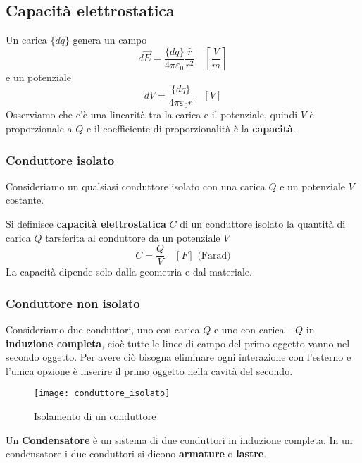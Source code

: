 \documentclass[a4paper]{article}
\begin{document}
\subsection{Capacità elettrostatica}
Un carica \( \{dq\}  \) genera un campo
\[
  d\vec{E} = \frac{\{dq\}}{4 \pi \varepsilon _0} \frac{\hat{r}}{r^2} \quad \left[ \frac{V}{m} \right]
\]
e un potenziale
\[
  dV = \frac{\{dq\}}{4 \pi \varepsilon_0 r} \quad \left[ V \right]
\] 
Osserviamo che c'è una linearità tra la carica e il potenziale, quindi \( V \) è
proporzionale a \( Q \) e il coefficiente di proporzionalità è la \textbf{capacità}.

\subsubsection{Conduttore isolato}
Consideriamo un qualsiasi conduttore isolato con una carica \( Q \) e un potenziale
\( V \) costante.

\begin{definition}
  Si definisce \textbf{capacità elettrostatica} \( C \) di un conduttore isolato la
  quantità di carica \( Q \) tarsferita al conduttore da un potenziale \( V \)
  \[
    C = \frac{Q}{V} \quad \left[ F \right] \text{ (Farad)}
  \]
  La capacità dipende solo dalla geometria e dal materiale.
\end{definition}

\subsubsection{Conduttore non isolato}
Consideriamo due conduttori, uno con carica \( Q \) e uno con carica \( -Q \) in
\textbf{induzione completa}, cioè tutte le linee di campo del primo oggetto vanno nel
secondo oggetto. Per avere ciò bisogna eliminare ogni interazione con l'esterno e l'unica
opzione è inserire il primo oggetto nella cavità del secondo.
\begin{figure}[H]
  \centering
  \texttt{[image: conduttore\_isolato]}
  \caption{Isolamento di un conduttore}
\end{figure}
\noindent
Un \textbf{Condensatore} è un sistema di due conduttori in induzione completa. In
un condensatore i due conduttori si dicono \textbf{armature} o \textbf{lastre}.
\end{document}
